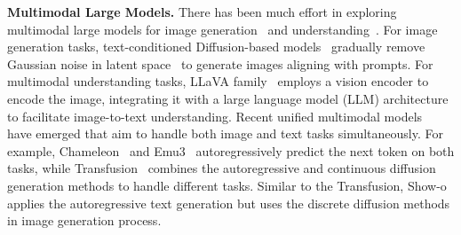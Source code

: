 \noindent \textbf{Multimodal Large Models.}
There has been much effort in exploring multimodal large models for image generation~\cite{rombach2022high,yang2024cogvideox,podellsdxl,sun2024autoregressive} and understanding~\cite{liu2024llava,bai2023qwen,ye2024mplug,zhu2023minigpt}. 
For image generation tasks, 
text-conditioned Diffusion-based models~\cite{rombach2022high,podellsdxl,song2020score,chen2023pixart,chen2024pixart,li2024hunyuan} gradually remove Gaussian noise in latent space~\cite{rombach2022high} to generate images aligning with prompts. 
For multimodal understanding tasks, 
LLaVA family~\cite{liu2024llava,lin2024moe,liu2024visual,liu2024improved,li2024llava,zhu2024llava} employs a vision encoder to encode the image, integrating it with a large language model (LLM) architecture to facilitate image-to-text understanding. 
Recent unified multimodal models~\cite{wu2023next,zhao2024monoformer,chern2024anole,dong2023dreamllm,wu2024janus} have emerged that aim to handle both image and text tasks simultaneously. For example, 
Chameleon~\cite{team2023gemini} 
and Emu3~\cite{wang2024emu3} autoregressively predict the next token on both tasks, 
while Transfusion~\cite{zhou2024transfusion} combines the autoregressive and continuous diffusion generation methods to handle different tasks. Similar to the Transfusion, Show-o~\cite{xie2024show} applies the autoregressive text generation but uses the discrete diffusion methods in image generation process. 
